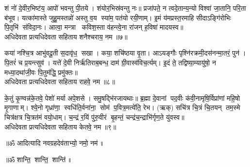 शं नो॑ दे॒वीर॒भिष्ट॑य॒ आपो॑ भवन्तु पी॒तये। शंयोर॒भिस्र॑वन्तु नः॥ प्रजा॑पते॒ न त्वदे॒तान्य॒न्यो विश्वा॑ जा॒तानि॒ परि॒ता ब॑भूव। यत्का॑मास्ते जुहु॒मस्तन्नो॑ अस्तु व॒य स्या॑म॒ पत॑यो रयी॒णाम्। इ॒मं य॑मप्रस्त॒रमाहि सीदाऽङ्गि॑रोभिः पि॒तृभि॑ संविदा॒नः। आत्वा॒ मन्त्रा कविश॒स्ता व॑हन्त्वे॒ना रा॑जन् ह॒विषा॑ मादयस्व॥ \\
अधिदेवता प्रत्यधिदेवता सहिताय शनैश्चराय॒ नम॥७॥ 

कया॑ नश्चि॒त्र आभु॑वदू॒ती स॒दावृ॑ध॒ सखा। कया॒ शचि॑ष्ठया वृ॒ता। आऽयङ्गौः पृश्नि॑रक्रमी॒दस॑नन्मा॒तरं॒ पुन॑। पि॒तरं॑ च प्र॒यन्त्सुव॑। यत्ते॑ दे॒वी निर्ऋ॑तिराब॒बन्ध॒ दाम॑ ग्री॒वास्व॑विच॒र्त्यम्। इ॒दं  ते॒ तद्विष्या॒म्यायु॑षो॒ न मध्या॒दथा॑जी॒वः पि॒तुम॑द्धि॒ प्रमु॑क्तः॥ \\
अधिदेवता प्रत्यधिदेवता सहिताय राहवे॒ नम॥८॥ 

के॒तुं कृ॒ण्वन्न॑के॒तवे॒ पेशो॑ मर्या अपे॒शसे। समु॒षद्भि॑रजायथाः॥ ब्र॒ह्मा दे॒वानां पद॒वीः क॑वी॒नामृषि॒र्विप्रा॑णां महि॒षो मृ॒गाणाम्। श्ये॒नो गृध्रा॑णा॒ स्वधि॑ति॒र्वना॑ना॒ सोम॑ प॒वित्र॒मत्ये॑ति॒ रेभ\sn{}। (ऋक्) सचि॑त्र चि॒त्रं चि॒तयन् तम॒स्मे चित्र॑क्षत्र चि॒त्रत॑मं वयो॒धाम्। च॒न्द्रं र॒यिं पु॑रु॒वीरं बृ॒हन्तं॒ चन्द्र॑च॒न्द्राभि॑र्गृण॒ते यु॑वस्व॥ \\
अधिदेवता प्रत्यधिदेवता सहिताय केतवे॒ नम॥९॥ 

\centerline{॥ॐ आदित्यादि नवग्रहदेव॑ताभ्यो॒ नमो॒ नम॑॥ }

\centerline{॥ॐ शान्ति॒ शान्ति॒ शान्ति॑॥}